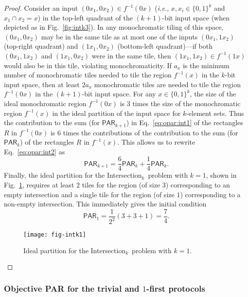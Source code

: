 \documentclass{article}
\theoremstyle{theorem}
\theoremstyle{definition}
\theoremstyle{remark}
\newcommand{\ie}{\emph{i.e.}}
\newcommand{\PAR}{\ensuremath{\mathsf{PAR}}}
\newcommand{\intersection}{{\sc In\-ter\-sec\-tion}\ensuremath{_k}}
\begin{document}
\begin{proof}
Consider an input $(0x_1,0x_2)\in f^{-1}(0x)$ (\ie, $x,x_i\in\{0,1\}^k$ and $x_1\cap x_2 = x$) in the top-left quadrant of the $(k+1)$-bit input space (when depicted as in Fig.~\ref{fig:intk3}).  In any monochromatic tiling of this space, $(0x_1,0x_2)$ may be in the same tile as at most one of the inputs $(0x_1,1x_2)$ (top-right quadrant) and $(1x_1,0x_2)$ (bottom-left quadrant)---if both $(0x_1,1x_2)$ and $(1x_1,0x_2)$ were in the same tile, then $(1x_1,1x_2)\in f^{-1}(1x)$ would also be in this tile, violating monochromaticity.  If $a_x$ is the minimum number of monochromatic tiles needed to tile the region $f^{-1}(x)$ in the $k$-bit input space, then at least $2 a_x$ monochromatic tiles are needed to tile the region $f^{-1}(0x)$ in the $(k+1)$-bit input space.  For any $x\in\{0,1\}^k$, the size of the ideal monochromatic region $f^{-1}(0x)$ is $3$ times the size of the monochromatic region $f^{-1}(x)$ in the ideal partition of the input space for $k$-element sets.  Thus the contribution to the sum (for $\PAR_{k+1}$) in Eq.~\ref{eq:opar:int1} of the rectangles $R$ in $f^{-1}(0x)$ is $6$ times the contributions of the contribution to the sum (for $\PAR_k$) of the rectangles $R$ in $f^{-1}(x)$.  This allows us to rewrite Eq.~\ref{eq:opar:int2} as
\[
\PAR_{k+1} = \frac{6}{4}\PAR_k + \frac{1}{4}\PAR_k.
\]
Finally, the ideal partition for the \intersection\ problem with $k=1$, shown in Fig.~\ref{fig:intk1}, requires at least $2$ tiles for the region (of size $3$) corresponding to an empty intersection and a single tile for the region (of size $1$) corresponding to a non-empty intersection.  This immediately gives the initial condition
\[
\PAR_1 = \frac{1}{2^{2}}\left(3+3+1\right) = \frac{7}{4}.
\]
\begin{figure}[htp]
\begin{center}
\texttt{[image: fig-intk1]}
\end{center}
\caption{Ideal partition for the \intersection\ problem with $k=1$.}\label{fig:intk1}
\end{figure}
\end{proof}

\subsubsection{Objective PAR for the trivial and $1$-first protocols}
\end{document}
